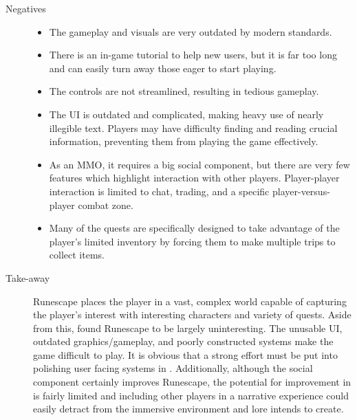 \begin{description}
\item[Negatives]{
\begin{itemize}
	\item{The gameplay and visuals are very outdated by modern standards.}
    \item{There is an in-game tutorial to help new users, but it is far too long and can easily turn away those eager to start playing.}
    \item{The controls are not streamlined, resulting in tedious gameplay.}
    \item{The UI is outdated and complicated, making heavy use of nearly illegible text. Players may have difficulty finding and reading crucial information, preventing them from playing the game effectively.}
    \item{As an MMO, it requires a big social component, but there are very few features which highlight interaction with other players. Player-player interaction is limited to chat, trading, and a specific player-versus-player combat zone.}
    \item{Many of the quests are specifically designed to take advantage of the player's limited inventory by forcing them to make multiple trips to collect items.}
\end{itemize}
}
\item[Take-away]{Runescape places the player in a vast, complex world capable of capturing the player's interest with interesting characters and variety of quests. Aside from this, \ourteam{} found Runescape to be largely uninteresting. The unusable UI, outdated graphics/gameplay, and poorly constructed systems make the game difficult to play. It is obvious that a strong effort must be put into polishing user facing systems in \ourgame{}. Additionally, although the social component certainly improves Runescape, the potential for improvement in \ourgame{} is fairly limited and including other players in a narrative experience could easily detract from the immersive environment and lore \ourteam{} intends to create.}
\end{description} 
